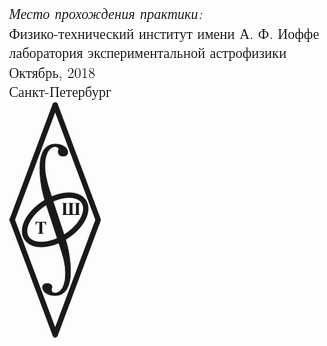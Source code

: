 \begin{titlepage}

{\large
\emph{Место прохождения практики:} \\
Физико-технический институт имени А. Ф. Иоффе\\ лаборатория экспериментальной астрофизики
}\\[3 cm]


{\large Октябрь, 2018 \\Санкт-Петербург}\\[0.55cm] %


\includegraphics{pictures/logo.png}\\[1cm] %
 

\vfill %

\end{titlepage}
